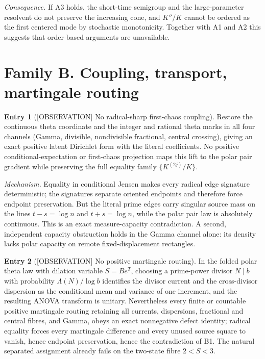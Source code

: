 \documentclass[11pt]{amsart}
\theoremstyle{definition}
\newcounter{family}
\newtheorem{entry}{Entry}[family]
\theoremstyle{remark}
\newcommand{\OBS}{\textup{[OBSERVATION]}}
\begin{document}
\emph{Consequence.} If A3 holds, the short-time semigroup and the
large-parameter resolvent do not preserve the increasing cone, and
\(K''/K\) cannot be ordered as the first centered mode by stochastic
monotonicity.  Together with A1 and A2 this suggests that order-based
arguments are unavailable.

\section{Family B. Coupling, transport, martingale routing}

\begin{entry}[\OBS{} No radical-sharp first-chaos coupling]
\label{ent:B1}
Restore the continuous theta coordinate and the integer and rational
theta marks in all four channels (Gamma, divisible, nondivisible
fractional, central crossing), giving an exact positive latent Dirichlet
form with the literal coefficients.  No positive conditional-expectation
or first-chaos projection maps this lift to the polar pair gradient while
preserving the full equality family
\(\{K^{(2j)}/K\}\).
\end{entry}

\emph{Mechanism.} Equality in conditional Jensen makes every radical edge
signature deterministic; the signatures separate oriented endpoints and
therefore force endpoint preservation.  But the literal prime edges carry
singular source mass on the lines \(t-s=\log n\) and \(t+s=\log n\), while
the polar pair law is absolutely continuous.  This is an exact
measure-capacity contradiction.  A second, independent capacity
obstruction holds in the Gamma channel alone: its density lacks polar
capacity on remote fixed-displacement rectangles.

\begin{entry}[\OBS{} No positive martingale routing]
\label{ent:B2}
In the folded polar theta law with dilation variable \(S=Be^T\), choosing
a prime-power divisor \(N\mid b\) with probability \(\Lambda(N)/\log b\)
identifies the divisor current and the cross-divisor dispersion as the
conditional mean and variance of one increment, and the resulting ANOVA
transform is unitary.  Nevertheless every finite or countable positive
martingale routing retaining all currents, dispersions, fractional and
central fibres, and Gamma, obeys an exact nonnegative defect identity;
radical equality forces every martingale difference and every unused
source square to vanish, hence endpoint preservation, hence the
contradiction of B1.  The natural separated assignment already fails on
the two-state fibre \(2<S<3\).
\end{entry}
\end{document}
